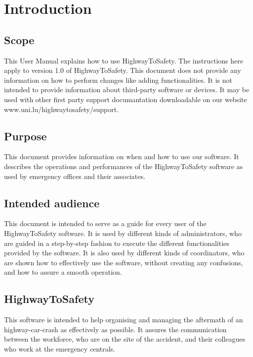 \chapter{Introduction}
\label{chap:introduction}

\section{Scope}
This User Manual explains how to use HighwayToSafety. The
instructions here apply to version 1.0 of HighwayToSafety.
This document does not provide any information on how to perform changes like
adding functionalities. It is not intended to provide information about
third-party software or devices.
It may be used with other first party support documantation
downloadable on our website www.uni.lu/highwaytosafety/support.
 
\section{Purpose}
This document provides information on when and how to use our software. It
describes the operations and performances of the HighwayToSafety software as
used by emergency offices and their associates.
\section{Intended audience}
This document is intended to serve as a guide for every user of the
HighwayToSafety software. It is used by different kinds of administrators, who
are guided in a step-by-step fashion to execute the different functionalities
provided by the software.
It is also used by different kinds of coordinators, who are shown how to
effectively use the software, without creating any confusions, and how to assure
a smooth operation.

\section{HighwayToSafety}
This software is intended to help organising and managing the
aftermath of an highway-car-crash as effectively as possible.
It assures the communication between the workforce, who are on the site of the
accident, and their colleagues who work at the emergency centrals. 


